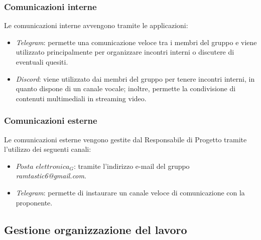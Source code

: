 \subsubsection{Comunicazioni interne}
Le comunicazioni interne avvengono tramite le applicazioni:
\begin{itemize}
    \item \textit{Telegram}: permette una comunicazione veloce tra i membri del gruppo e viene utilizzato principalmente per organizzare incontri interni o discutere di eventuali quesiti.
    \item \textit{Discord}: viene utilizzato dai membri del gruppo per tenere incontri interni, in quanto dispone di un canale vocale; inoltre, permette la condivisione di contenuti multimediali in streaming video.
\end{itemize}

\subsubsection{Comunicazioni esterne}
Le comunicazioni esterne vengono gestite dal Responsabile di Progetto tramite l’utilizzo dei seguenti
canali:
\begin{itemize}
    \item  $\textit{Posta elettronica}_G$: tramite l’indirizzo e-mail del gruppo \textit{ramtastic6@gmail.com}.
    \item  \textit{Telegram}: permette di instaurare un canale veloce di comunicazione con la proponente.
\end{itemize}

\subsection{Gestione organizzazione del lavoro}
